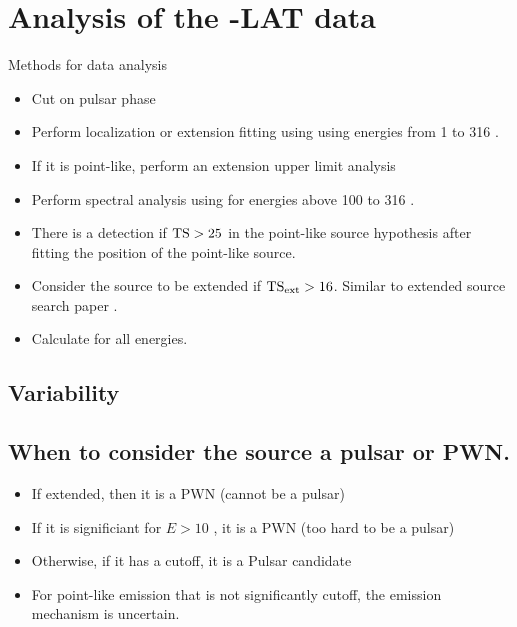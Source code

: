 \section{Analysis of the \fermi-LAT data}


Methods for data analysis
\begin{itemize}
\item Cut on pulsar phase
\item Perform localization or extension fitting using \gtlike using energies from 1 \gev to 316 \gev.
\item If it is point-like, perform an extension upper limit analysis 
\item Perform spectral analysis using \gtlike for energies above 100 \mev to 316 \gev.
\item There is a detection if  $\text{TS}>25$ in the point-like source hypothesis after fitting the position of the point-like source. 
\item Consider the source to be extended if $\text{TS}_\text{ext}>16$. Similar to extended source search paper .
\item Calculate \tscut for all energies.
\end{itemize}

\subsection{Variability}

\subsection{When to consider the source a pulsar or PWN.}
\begin{itemize}
  \item If extended, then it is a PWN (cannot be a pulsar)
  \item If it is significiant for $E>10$ \gev, it is a PWN (too hard to be a pulsar)
  \item Otherwise, if it has a cutoff, it is a Pulsar candidate
  \item For point-like emission that is not significantly cutoff, the emission  mechanism is uncertain.
\end{itemize}
